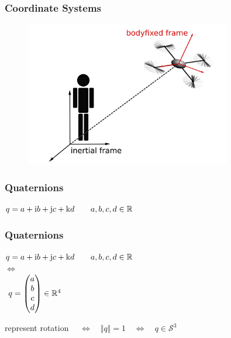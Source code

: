 \begin{frame}
	\frametitle{Coordinate Systems}
		\begin{figure}[p]
			\centering
			\includegraphics[width=0.8\textwidth]{images/Koordinatensysteme.pdf}
			\label{fig:Koordinatensysteme}
	\end{figure}
\end{frame}

\begin{frame}
	\frametitle{Quaternions}
	\begin{block}{}
		\centering
		\vspace{1ex}
		\( q = a + \textup{i}b+\textup{j}c+\textup{k}d \qquad a, b, c, d \in \mathbb{R} \)
		\vspace{1ex}
	 \end{block}
	\end{frame}

\begin{frame}
	\frametitle{Quaternions}
	\begin{block}{}
		\centering
		\( q = a + \textup{i}b+\textup{j}c+\textup{k}d \qquad a, b, c, d \in \mathbb{R} \) \\
		\vspace{.5ex}
		\(\Leftrightarrow\) \\
		\vspace{1ex}
		\( \hspace{1ex} q = \begin{pmatrix} a \\ b \\ c\\ d \end{pmatrix} \in \mathbb{R}^4 \)
	\end{block}
	
	\vspace{1em}
			 \centering
			represent rotation \( \quad \Leftrightarrow \quad \Vert q \Vert = 1 \quad \Leftrightarrow \quad q \in \mathcal{S}^3\) 
\end{frame}

